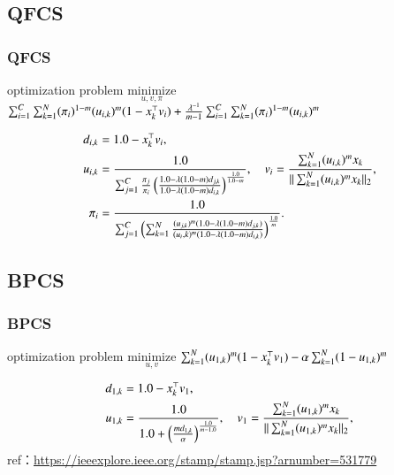 \documentclass[fleqn,dvipdfmx,10pt]{beamer}
\begin{document}
\subsection{QFCS}
\begin{frame}\frametitle{QFCS}%
  \begin{block}{optimization problem}
    $\underset{u,v,\pi}{\text{minimize}}$
    $\sum_{i=1}^C\sum_{k=1}^N(\pi_{i})^{1-m}(u_{i,k})^m(1-x_k^{\top}v_i)+\frac{\lambda^{-1}}{m-1}\sum_{i=1}^C\sum_{k=1}^N(\pi_{i})^{1-m}(u_{i,k})^m$\centering\\
  \end{block}
  \begin{align*}
    d_{i,k}&=1.0-x_k^{\top}v_i,\\
    u_{i,k}&=\frac{1.0}{\sum_{j=1}^C\frac{\pi_{j}}{\pi_{i}}\left(\frac{1.0-\lambda(1.0-m)d_{j,k}}{1.0-\lambda(1.0-m)d_{i,k}}\right)^{\frac{1.0}{1.0-m}}},\quad
    v_{i}=\frac{\sum_{k=1}^N (u_{i,k})^m x_{k}}{||\sum_{k=1}^N (u_{i,k})^mx_{k}||_2},\\
    \pi_{i}&=\frac{1.0}{\sum_{j=1}^C\left(\sum_{k=1}^N\frac{(u_{j,k})^m(1.0-\lambda(1.0-m)d_{j,k})}{(u_i,k)^m(1.0-\lambda(1.0-m)d_{i,k})}\right)^{\frac{1.0}{m}}}.\\
  \end{align*}
\end{frame}

\subsection{BPCS}
\begin{frame}\frametitle{BPCS}
  \begin{block}{optimization problem}
    $\underset{u,v}{\text{minimize}}$
    $\sum_{k=1}^N(u_{1,k})^m(1-x_k^{\top}v_1)-\alpha\sum_{k=1}^N(1-u_{1,k})^m$ \centering\\
  \end{block}
  \begin{align*}
    d_{1,k}&=1.0-x_k^{\top}v_1,\\
    u_{1,k}&=\frac{1.0}{1.0+\left(\frac{md_{1,k}}{\alpha}\right)^{\frac{1.0}{m-1.0}}},\quad
    v_{1}=\frac{\sum_{k=1}^N (u_{1,k})^m x_{k}}{||\sum_{k=1}^N (u_{1,k})^mx_{k}||_2},\\
  \end{align*}
  ref：\url{https://ieeexplore.ieee.org/stamp/stamp.jsp?arnumber=531779}\centering
\end{frame}
\end{document}
